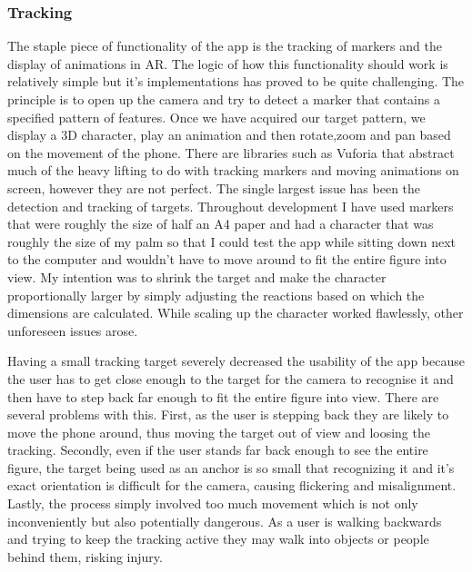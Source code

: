 \documentclass{l4proj}
\begin{document}
\subsubsection{Tracking}
The staple piece of functionality of the app is the tracking of markers and the display of animations in AR. The logic of how this functionality should work is relatively simple but it's implementations has proved to be quite challenging. The principle is to open up the camera and try to detect a marker that contains a specified pattern of features. Once we have acquired our target pattern, we display a 3D character, play an animation and then rotate,zoom and pan based on the movement of the phone. There are libraries such as Vuforia that abstract much of the heavy lifting to do with tracking markers and moving animations on screen, however they are not perfect. The single largest issue has been the detection and tracking of targets. Throughout development I have used markers that were roughly the size of half an A4 paper and had a character that was roughly the size of my palm so that I could test the app while sitting down next to the computer and wouldn't have to move around to fit the entire figure into view. My intention was to shrink the target and make the character proportionally larger by simply adjusting the reactions based on which the dimensions are calculated. While scaling up the character worked flawlessly, other unforeseen issues arose.

Having a small tracking target severely decreased the usability of the app because the user has to get close enough to the target for the camera to recognise it and then have to step back far enough to fit the entire figure into view. There are several problems with this. First, as the user is stepping back they are likely to move the phone around, thus moving the target out of view and loosing the tracking. Secondly, even if the user stands far back enough to see the entire figure, the target being used as an anchor is so small that recognizing it and it's exact orientation is difficult for the camera, causing flickering and misalignment. Lastly, the process simply involved too much movement which is not only inconveniently but also potentially dangerous. As a user is walking backwards and trying to keep the tracking active they may walk into objects or people behind them, risking injury.
\end{document}
